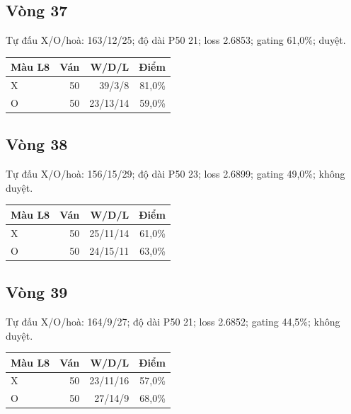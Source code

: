 \subsection*{Vòng 37}

Tự đấu X/O/hoà: 163/12/25; độ dài P50 21; loss 2.6853; gating 61,0\%; duyệt.

\begin{center}\scriptsize\begin{tabular}{@{}lrrr@{}}\toprule

Màu L8 & Ván & W/D/L & Điểm \\

\midrule

X & 50 & 39/3/8 & 81,0\% \\

O & 50 & 23/13/14 & 59,0\% \\

\bottomrule\end{tabular}\end{center}

\subsection*{Vòng 38}

Tự đấu X/O/hoà: 156/15/29; độ dài P50 23; loss 2.6899; gating 49,0\%; không duyệt.

\begin{center}\scriptsize\begin{tabular}{@{}lrrr@{}}\toprule

Màu L8 & Ván & W/D/L & Điểm \\

\midrule

X & 50 & 25/11/14 & 61,0\% \\

O & 50 & 24/15/11 & 63,0\% \\

\bottomrule\end{tabular}\end{center}

\subsection*{Vòng 39}

Tự đấu X/O/hoà: 164/9/27; độ dài P50 21; loss 2.6852; gating 44,5\%; không duyệt.

\begin{center}\scriptsize\begin{tabular}{@{}lrrr@{}}\toprule

Màu L8 & Ván & W/D/L & Điểm \\

\midrule

X & 50 & 23/11/16 & 57,0\% \\

O & 50 & 27/14/9 & 68,0\% \\

\bottomrule\end{tabular}\end{center}

